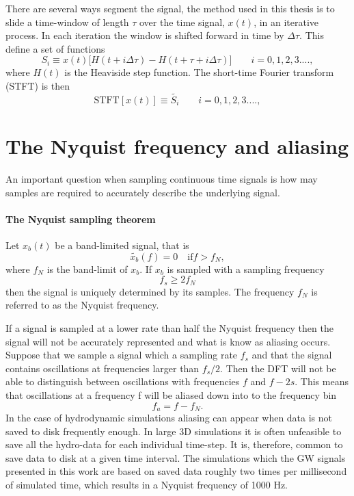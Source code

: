 There are several ways segment the signal, the method used in this thesis 
is to slide a time-window of length $\tau$ over the time signal, $x(t)$, in an iterative
process. In each iteration the window is shifted forward in time by $\Delta \tau$.
This define a set of functions
\begin{equation}
S_i \equiv x(t) \big[ H(t+i \Delta \tau) - H(t + \tau + i \Delta \tau) \big] \qquad i = 0,1,2,3 ....,
\end{equation}
where $H(t)$ is the Heaviside step function.
The short-time Fourier transform (STFT) is then
\begin{equation}                                                                                                                                                  
\text{STFT}[x(t)] \equiv \widetilde{S_i} \qquad i = 0,1,2,3 ....,                                                         
\end{equation}

\section{The Nyquist frequency and aliasing}
An important question when sampling continuous 
time signals is how may samples are required to accurately describe the
underlying signal.
\begin{mdframed}[nobreak=true]
\paragraph{The Nyquist sampling theorem}
Let $x_b(t)$ be a band-limited signal, that is
\begin{equation}
\widetilde{x_b}(f) = 0 \quad \text{if} f > f_N,
\end{equation}
where $f_N$ is the band-limit of $x_b$. If $x_b$ is sampled with a sampling frequency
\begin{equation}
f_s \geq 2 f_N
\end{equation}
then the signal is uniquely determined by its samples. The frequency $f_N$ is referred to 
as the Nyquist frequency.
\end{mdframed}

If a signal is sampled at a lower rate than half the Nyquist frequency then
the signal will not be accurately represented and what is know as aliasing occurs.
Suppose that we sample a signal which a sampling rate $f_s$ and that the signal 
contains oscillations at frequencies larger than $f_s /2$. Then the 
DFT will not be able to distinguish between oscillations with 
frequencies $f$ and $f - 2s$. This means that oscillations at a frequency
f will be aliased down into to the frequency bin
\begin{equation}
f_a = f - f_N.
\end{equation}
In the case of hydrodynamic simulations aliasing can appear when data is not saved
to disk frequently enough. In large 3D simulations it is often unfeasible to 
save all the hydro-data for each individual time-step. It is, therefore, common to
save data to disk at a given time interval. The simulations which the GW signals presented
in this work are based on saved data roughly two times per millisecond of simulated time, which results in a Nyquist frequency of
1000 Hz. 

